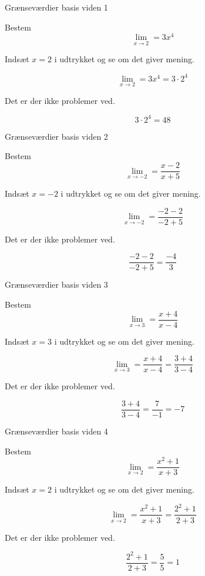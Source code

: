 \documentclass{article}
\begin{document}
\tableofcontents
\newpage

\begin{exercise}{Grænseværdier basis viden 1}

Bestem \[\lim_{x \to 2} = 3x^4\]



\hint
Indsæt $x=2$ i udtrykket og se om det giver mening.

\hint
\[
\lim_{x \to 2} = 3x^4 = 3 \cdot 2^4
\]

\hint 
Det er der ikke problemer ved.

\hint
\[
3 \cdot 2^4 = 48
\]

\end{exercise}

\newpage
\begin{exercise}{Grænseværdier basis viden 2}
	
	Bestem \[\lim_{x \to -2} = \frac{x-2}{x+5}\]
	
	
	
	\hint
	Indsæt $x=-2$ i udtrykket og se om det giver mening.
	
	\hint
	\[
	\lim_{x \to -2} = \frac{-2-2}{-2+5}
	\]
	
	\hint 
	Det er der ikke problemer ved.
	
	\hint
	\[
	\frac{-2-2}{-2+5} = \frac{-4}{3}
	\]
	
\end{exercise}

\newpage
\begin{exercise}{Grænseværdier basis viden 3}
	
	Bestem \[\lim_{x \to 3} = \frac{x+4}{x-4}\]
	
	
	
	\hint
	Indsæt $x=3$ i udtrykket og se om det giver mening.
	
	\hint
	\[
	\lim_{x \to 3} = \frac{x+4}{x-4} = \frac{3+4}{3-4}
	\]
	
	\hint 
	Det er der ikke problemer ved.
	
	\hint
	\[
	\frac{3+4}{3-4} = \frac{7}{-1} = -7
	\]
	
\end{exercise}

\newpage
\begin{exercise}{Grænseværdier basis viden 4}
	
	Bestem \[\lim_{x \to 2} = \frac{x^2+1}{x+3}\]
	
	
	
	\hint
	Indsæt $x=2$ i udtrykket og se om det giver mening.
	
	\hint
	\[
	\lim_{x \to 2} = \frac{x^2+1}{x+3} = \frac{2^2+1}{2+3}
	\]
	
	\hint 
	Det er der ikke problemer ved.
	
	\hint
	\[
	\frac{2^2+1}{2+3} = \frac{5}{5} = 1
	\]
	
\end{exercise}
\end{document}
